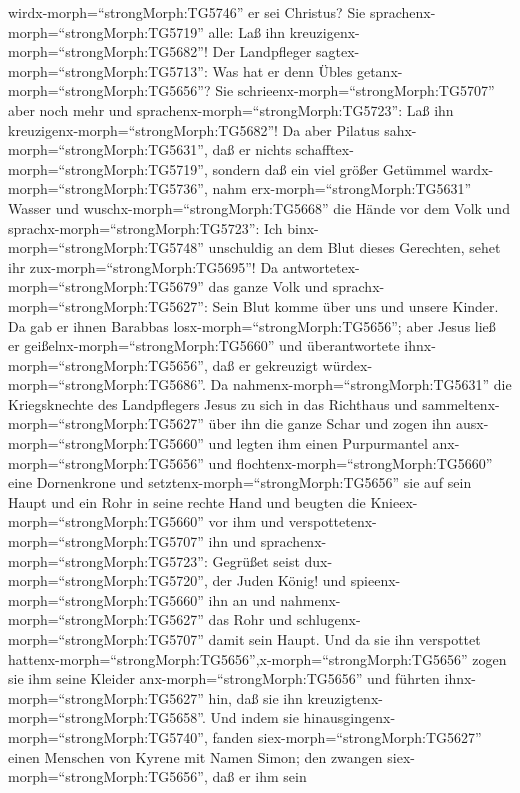 wirdx-morph=``strongMorph:TG5746'' er sei Christus? Sie
sprachenx-morph=``strongMorph:TG5719'' alle: Laß ihn
kreuzigenx-morph=``strongMorph:TG5682''!  Der Landpfleger
sagtex-morph=``strongMorph:TG5713'': Was hat er denn Übles
getanx-morph=``strongMorph:TG5656''? Sie
schrieenx-morph=``strongMorph:TG5707'' aber noch mehr und
sprachenx-morph=``strongMorph:TG5723'': Laß ihn
kreuzigenx-morph=``strongMorph:TG5682''!  Da aber Pilatus
sahx-morph=``strongMorph:TG5631'', daß er nichts
schafftex-morph=``strongMorph:TG5719'', sondern daß ein viel größer
Getümmel wardx-morph=``strongMorph:TG5736'', nahm
erx-morph=``strongMorph:TG5631'' Wasser und
wuschx-morph=``strongMorph:TG5668'' die Hände vor dem Volk und
sprachx-morph=``strongMorph:TG5723'': Ich
binx-morph=``strongMorph:TG5748'' unschuldig an dem Blut dieses
Gerechten, sehet ihr zux-morph=``strongMorph:TG5695''!  Da
antwortetex-morph=``strongMorph:TG5679'' das ganze Volk und
sprachx-morph=``strongMorph:TG5627'': Sein Blut komme über uns und
unsere Kinder.  Da gab er ihnen Barabbas
losx-morph=``strongMorph:TG5656''; aber Jesus ließ er
geißelnx-morph=``strongMorph:TG5660'' und überantwortete
ihnx-morph=``strongMorph:TG5656'', daß er gekreuzigt
würdex-morph=``strongMorph:TG5686''.  Da
nahmenx-morph=``strongMorph:TG5631'' die Kriegsknechte des Landpflegers
Jesus zu sich in das Richthaus und
sammeltenx-morph=``strongMorph:TG5627'' über ihn die ganze Schar
 und zogen ihn ausx-morph=``strongMorph:TG5660'' und legten
ihm einen Purpurmantel anx-morph=``strongMorph:TG5656'' 
und flochtenx-morph=``strongMorph:TG5660'' eine Dornenkrone und
setztenx-morph=``strongMorph:TG5656'' sie auf sein Haupt und ein Rohr in
seine rechte Hand und beugten die Knieex-morph=``strongMorph:TG5660''
vor ihm und verspottetenx-morph=``strongMorph:TG5707'' ihn und
sprachenx-morph=``strongMorph:TG5723'': Gegrüßet seist
dux-morph=``strongMorph:TG5720'', der Juden König!  und
spieenx-morph=``strongMorph:TG5660'' ihn an und
nahmenx-morph=``strongMorph:TG5627'' das Rohr und
schlugenx-morph=``strongMorph:TG5707'' damit sein Haupt. 
Und da sie ihn verspottet
hattenx-morph=``strongMorph:TG5656'',x-morph=``strongMorph:TG5656''
zogen sie ihm seine Kleider anx-morph=``strongMorph:TG5656'' und führten
ihnx-morph=``strongMorph:TG5627'' hin, daß sie ihn
kreuzigtenx-morph=``strongMorph:TG5658''.  Und indem sie
hinausgingenx-morph=``strongMorph:TG5740'', fanden
siex-morph=``strongMorph:TG5627'' einen Menschen von Kyrene mit Namen
Simon; den zwangen siex-morph=``strongMorph:TG5656'', daß er ihm sein
